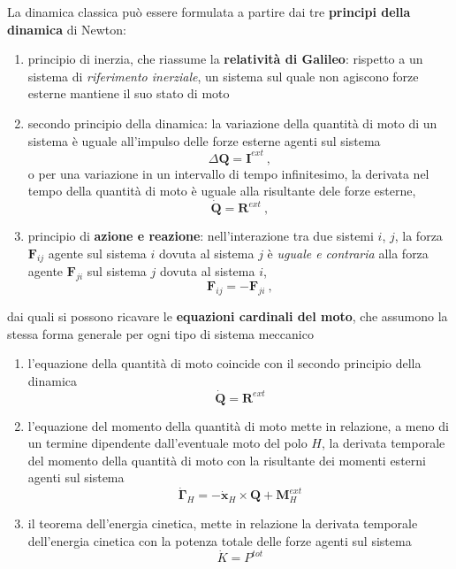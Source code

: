 La dinamica classica può essere formulata a partire dai tre \textbf{principi della dinamica} di Newton:
\begin{enumerate}
    \item principio di inerzia, che riassume la \textbf{relatività di Galileo}: rispetto a un sistema di \textit{riferimento inerziale}, un sistema sul quale non agiscono forze esterne mantiene il suo stato di moto
    \item secondo principio della dinamica: la variazione della quantità di moto di un sistema è uguale all'impulso delle forze esterne agenti sul sistema
        \begin{equation}
            \Delta \mathbf{Q} = \mathbf{I}^{ext} \ ,
        \end{equation}
        o per una variazione in un intervallo di tempo infinitesimo, la derivata nel tempo della quantità di moto è uguale alla risultante dele forze esterne,
        \begin{equation}
            \dot{\mathbf{Q}} = \mathbf{R}^{ext} \ ,
        \end{equation}
    \item principio di \textbf{azione e reazione}: nell'interazione tra due sistemi $i$, $j$, la forza $\mathbf{F}_{ij}$ agente sul sistema $i$ dovuta al sistema $j$ è \textit{uguale e contraria} alla forza agente $\mathbf{F}_{ji}$ sul sistema $j$ dovuta al sistema $i$,
        \begin{equation}
           \mathbf{F}_{ij} = - \mathbf{F}_{ji} \ ,
        \end{equation}
\end{enumerate}
dai quali si possono ricavare le \textbf{equazioni cardinali del moto}, che assumono la stessa forma generale per ogni tipo di sistema meccanico
\begin{enumerate}
    \item l'equazione della quantità di moto coincide con il secondo principio della dinamica
        \begin{equation}
            \dot{\mathbf{Q}} = \mathbf{R}^{ext}
        \end{equation}
    \item l'equazione del momento della quantità di moto mette in relazione, a meno di un termine dipendente dall'eventuale moto del polo $H$, la derivata temporale del momento della quantità di moto con la risultante dei momenti esterni agenti sul sistema
        \begin{equation}
            \dot{\mathbf{\Gamma}}_H = -\dot{\mathbf{x}}_H \times \mathbf{Q} + \mathbf{M}_H^{ext}
        \end{equation}
    \item il teorema dell'energia cinetica, mette in relazione la derivata temporale dell'energia cinetica con la potenza totale delle forze agenti sul sistema
        \begin{equation}
            \dot{K} = P^{tot}
        \end{equation}
\end{enumerate}


